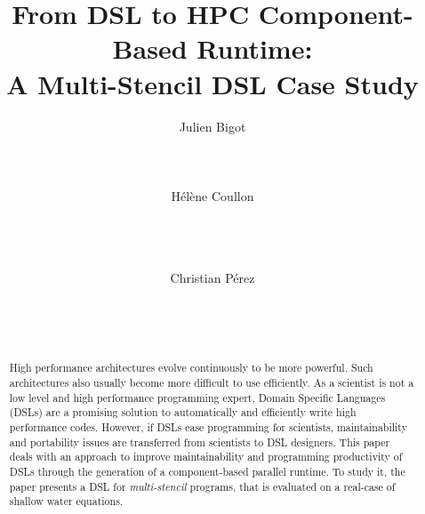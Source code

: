\documentclass{acm_proc_article-sp}
\begin{document}


\title{From DSL to HPC Component-Based Runtime:\\ A Multi-Stencil DSL Case Study}

\author{
\alignauthor
Julien Bigot\\
       \\
       \\
       \\ %
\alignauthor
H\'el\`ene Coullon\\
       \\
       \\
       \\
\and
\alignauthor
Christian P\'erez\\
       \\
       \\
       \\
}

\maketitle
\begin{abstract}
  High performance architectures evolve continuously to be more powerful. Such architectures also usually become more difficult to use efficiently. As a scientist is not a low level and high performance programming expert, Domain Specific Languages (DSLs) are a promising solution to automatically and efficiently write high performance codes. However, if DSLs ease programming for scientists, maintainability and portability issues are transferred from scientists to DSL designers. This paper deals with an approach to improve maintainability and programming productivity of DSLs through the generation of a component-based parallel runtime. To study it, the paper presents a  DSL for \emph{multi-stencil} programs, that is evaluated on a real-case of shallow water equations.
\end{abstract}
\end{document}
